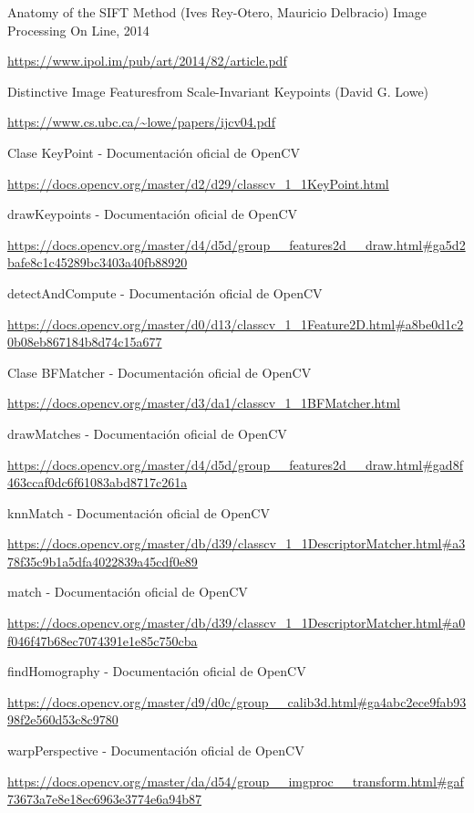\documentclass[12pt,spanish]{article}
\begin{document}
\begin{thebibliography}{9}


		Anatomy of the SIFT Method (Ives Rey-Otero, Mauricio Delbracio) Image Processing On Line, 2014

		\url{https://www.ipol.im/pub/art/2014/82/article.pdf}


		Distinctive Image Featuresfrom Scale-Invariant Keypoints (David G. Lowe)

		\url{https://www.cs.ubc.ca/~lowe/papers/ijcv04.pdf}


		Clase KeyPoint - Documentación oficial de OpenCV

		\url{https://docs.opencv.org/master/d2/d29/classcv_1_1KeyPoint.html}


		drawKeypoints - Documentación oficial de OpenCV

		\url{https://docs.opencv.org/master/d4/d5d/group__features2d__draw.html#ga5d2bafe8c1c45289bc3403a40fb88920}



		detectAndCompute - Documentación oficial de OpenCV

		\url{https://docs.opencv.org/master/d0/d13/classcv_1_1Feature2D.html#a8be0d1c20b08eb867184b8d74c15a677}


		Clase BFMatcher - Documentación oficial de OpenCV

		\url{https://docs.opencv.org/master/d3/da1/classcv_1_1BFMatcher.html}


		drawMatches - Documentación oficial de OpenCV

		\url{https://docs.opencv.org/master/d4/d5d/group__features2d__draw.html#gad8f463ccaf0dc6f61083abd8717c261a}


		knnMatch - Documentación oficial de OpenCV

		\url{https://docs.opencv.org/master/db/d39/classcv_1_1DescriptorMatcher.html#a378f35c9b1a5dfa4022839a45cdf0e89}


		match - Documentación oficial de OpenCV

		\url{https://docs.opencv.org/master/db/d39/classcv_1_1DescriptorMatcher.html#a0f046f47b68ec7074391e1e85c750cba}


		findHomography - Documentación oficial de OpenCV

		\url{https://docs.opencv.org/master/d9/d0c/group__calib3d.html#ga4abc2ece9fab9398f2e560d53c8c9780}


		warpPerspective - Documentación oficial de OpenCV

		\url{https://docs.opencv.org/master/da/d54/group__imgproc__transform.html#gaf73673a7e8e18ec6963e3774e6a94b87}

\end{thebibliography}
\end{document}
